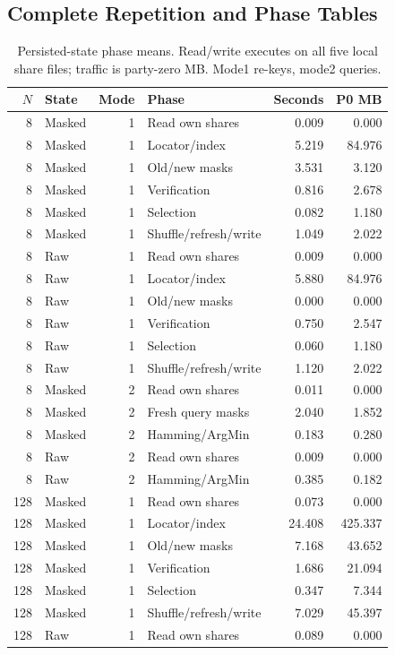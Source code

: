 \subsection{Complete Repetition and Phase Tables}\label{suppsec:generated_supplement:1}

\begin{table}[H]
\caption{Persisted-state phase means. Read/write executes on all five local share files; traffic is party-zero MB. Mode1 re-keys, mode2 queries.}
\label{tab:persisted_phases0}\centering\small
\setlength{\tabcolsep}{3pt}
\begin{tabular}{rlrlrr}
\toprule
$N$ & State & Mode & Phase & Seconds & P0 MB \\
\midrule
8 & Masked & 1 & Read own shares & 0.009 & 0.000 \\
8 & Masked & 1 & Locator/index & 5.219 & 84.976 \\
8 & Masked & 1 & Old/new masks & 3.531 & 3.120 \\
8 & Masked & 1 & Verification & 0.816 & 2.678 \\
8 & Masked & 1 & Selection & 0.082 & 1.180 \\
8 & Masked & 1 & Shuffle/refresh/write & 1.049 & 2.022 \\
8 & Raw & 1 & Read own shares & 0.009 & 0.000 \\
8 & Raw & 1 & Locator/index & 5.880 & 84.976 \\
8 & Raw & 1 & Old/new masks & 0.000 & 0.000 \\
8 & Raw & 1 & Verification & 0.750 & 2.547 \\
8 & Raw & 1 & Selection & 0.060 & 1.180 \\
8 & Raw & 1 & Shuffle/refresh/write & 1.120 & 2.022 \\
8 & Masked & 2 & Read own shares & 0.011 & 0.000 \\
8 & Masked & 2 & Fresh query masks & 2.040 & 1.852 \\
8 & Masked & 2 & Hamming/ArgMin & 0.183 & 0.280 \\
8 & Raw & 2 & Read own shares & 0.009 & 0.000 \\
8 & Raw & 2 & Hamming/ArgMin & 0.385 & 0.182 \\
128 & Masked & 1 & Read own shares & 0.073 & 0.000 \\
128 & Masked & 1 & Locator/index & 24.408 & 425.337 \\
128 & Masked & 1 & Old/new masks & 7.168 & 43.652 \\
128 & Masked & 1 & Verification & 1.686 & 21.094 \\
128 & Masked & 1 & Selection & 0.347 & 7.344 \\
128 & Masked & 1 & Shuffle/refresh/write & 7.029 & 45.397 \\
128 & Raw & 1 & Read own shares & 0.089 & 0.000 \\
\bottomrule
\end{tabular}
\end{table}


